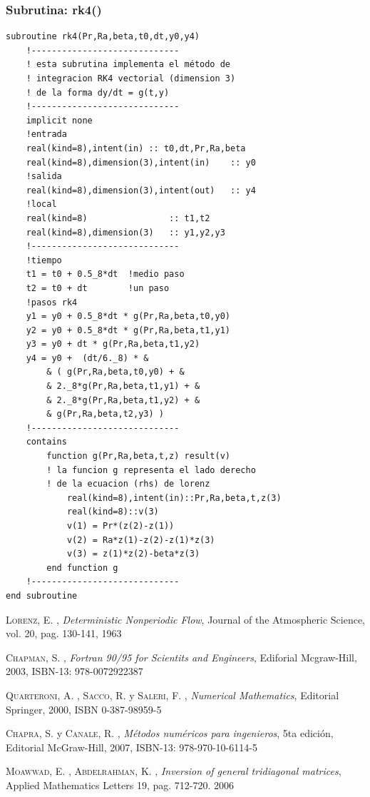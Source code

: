 \documentclass[letterpaper]{article}
\begin{document}
\subsubsection*{Subrutina: rk4()}
\begin{lstlisting}
subroutine rk4(Pr,Ra,beta,t0,dt,y0,y4)
	!-----------------------------
	! esta subrutina implementa el método de 
	! integracion RK4 vectorial (dimension 3)
	! de la forma dy/dt = g(t,y)
	!-----------------------------
	implicit none
	!entrada
	real(kind=8),intent(in)	:: t0,dt,Pr,Ra,beta
	real(kind=8),dimension(3),intent(in)	:: y0
	!salida
	real(kind=8),dimension(3),intent(out)	:: y4
	!local
	real(kind=8)				:: t1,t2
	real(kind=8),dimension(3)	:: y1,y2,y3
	!-----------------------------
	!tiempo
	t1 = t0 + 0.5_8*dt	!medio paso
	t2 = t0 + dt		!un paso
	!pasos rk4	
	y1 = y0 + 0.5_8*dt * g(Pr,Ra,beta,t0,y0)
	y2 = y0 + 0.5_8*dt * g(Pr,Ra,beta,t1,y1)
	y3 = y0 + dt * g(Pr,Ra,beta,t1,y2)	
	y4 = y0 +  (dt/6._8) * &
		& ( g(Pr,Ra,beta,t0,y0) + &
		& 2._8*g(Pr,Ra,beta,t1,y1) + &
		& 2._8*g(Pr,Ra,beta,t1,y2) + &
		& g(Pr,Ra,beta,t2,y3) )
	!-----------------------------
	contains
		function g(Pr,Ra,beta,t,z) result(v)
		! la funcion g representa el lado derecho
		! de la ecuacion (rhs) de lorenz
			real(kind=8),intent(in)::Pr,Ra,beta,t,z(3)
			real(kind=8)::v(3)
			v(1) = Pr*(z(2)-z(1))
			v(2) = Ra*z(1)-z(2)-z(1)*z(3)
			v(3) = z(1)*z(2)-beta*z(3)
		end function g
	!-----------------------------
end subroutine
\end{lstlisting}

\newpage

\begin{thebibliography}{3}

 \textsc{Lorenz, E.} , \textit{Deterministic Nonperiodic Flow}, Journal of the Atmospheric Science, vol. 20, pag. 130-141, 1963

 \textsc{Chapman, S.} , \textit{Fortran 90/95 for Scientits and Engineers}, Ediforial Mcgraw-Hill, 2003, ISBN-13: 978-0072922387

 \textsc{Quarteroni, A.} , \textsc{Sacco, R.} y \textsc{Saleri, F.} , \textit{Numerical Mathematics},
Editorial Springer, 2000, ISBN 0-387-98959-5

 \textsc{Chapra, S.} y \textsc{Canale, R.} , \textit{Métodos numéricos para ingenieros}, 5ta edición,
Editorial McGraw-Hill, 2007, ISBN-13: 978-970-10-6114-5

 \textsc{Moawwad, E.} , \textsc{Abdelrahman, K.} , \textit{Inversion of general tridiagonal matrices}, Applied Mathematics Letters 19, pag. 712-720. 2006

\end{thebibliography}
\end{document}
